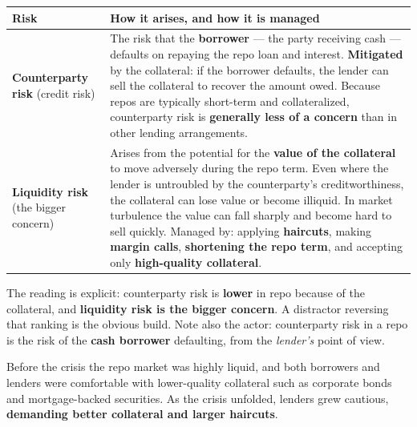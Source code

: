 \begin{center}
\small
\begin{tabularx}{\textwidth}{@{}p{3.4cm} X@{}}
\toprule
\rowcolor{FRMSoft}\textbf{Risk} & \textbf{How it arises, and how it is managed} \\
\midrule
\textbf{Counterparty risk} \newline (credit risk) &
The risk that the \textbf{borrower} --- the party receiving cash --- defaults on repaying the repo loan and interest. \textbf{Mitigated} by the collateral: if the borrower defaults, the lender can sell the collateral to recover the amount owed. Because repos are typically short-term and collateralized, counterparty risk is \textbf{generally less of a concern} than in other lending arrangements. \\
\addlinespace
\textbf{Liquidity risk} \newline (the bigger concern) &
Arises from the potential for the \textbf{value of the collateral} to move adversely during the repo term. Even where the lender is untroubled by the counterparty's creditworthiness, the collateral can lose value or become illiquid. In market turbulence the value can fall sharply and become hard to sell quickly. Managed by: applying \textbf{haircuts}, making \textbf{margin calls}, \textbf{shortening the repo term}, and accepting only \textbf{high-quality collateral}. \\
\bottomrule
\end{tabularx}
\end{center}

\begin{lrtrapbox}
The reading is explicit: counterparty risk is \textbf{lower} in repo because of the collateral, and \textbf{liquidity risk is the bigger concern}. A distractor reversing that ranking is the obvious build. Note also the actor: counterparty risk in a repo is the risk of the \textbf{cash borrower} defaulting, from the \emph{lender's} point of view.
\end{lrtrapbox}


Before the crisis the repo market was highly liquid, and both borrowers and lenders were comfortable with lower-quality collateral such as corporate bonds and mortgage-backed securities. As the crisis unfolded, lenders grew cautious, \textbf{demanding better collateral and larger haircuts}.

